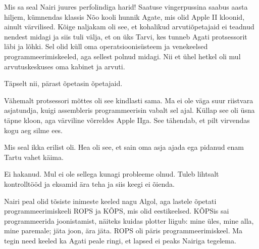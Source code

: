 
Mis sa seal Nairi juures perfolindiga harid! Saatuse vingerpussina saabus 
aasta hiljem, kümnendas klassis Nõo kooli hunnik 
Agate, mis olid Apple II kloonid, 
ainult värvilised. Kõige naljakam oli see, et kohalikud arvutiõpetajaid ei 
teadnud nendest midagi ja siis tuli välja, et on üks Tarvi, kes tunneb Agati
protsessorit läbi ja lõhki. Sel olid küll oma operatsioonisüsteem ja 
venekeelsed programmeerimiskeeled, aga sellest polnud midagi. Nii et ühel hetkel 
oli mul arvutuskeskuses oma kabinet ja arvuti. 


Täpselt nii, pärast õpetasin õpetajaid. 


Vähemalt protsessori mõttes oli see kindlasti sama. Ma ei ole väga suur riistvara 
asjatundja, kuigi assembleris programmeerisin 
vabalt sel ajal. Küllap see oli üsna täpne kloon, aga 
värviline võrreldes Apple IIga. See tähendab, et pilt virvendas kogu aeg 
silme ees. 


Mis seal ikka erilist oli. Hea oli see, et sain oma asja ajada ega pidanud enam Tartu vahet 
käima.


Ei hakanud. Mul ei ole sellega kunagi probleeme olnud. Tuleb 
lihtsalt kontrolltööd ja eksamid ära teha ja siis keegi ei õienda.

Nairi peal olid tõsiste inimeste keeled nagu Algol, aga 
lastele õpetati programmeerimiskeeli ROPS ja 
KÕPS, mis olid eestikeelsed. KÕPSis 
sai programmeerida joonistamist, näiteks kuidas plotter 
liigub: mine üles, mine alla, mine paremale; jäta joon, ära jäta. ROPS oli 
päris programmeerimiskeel. Ma tegin need keeled ka Agati peale ringi, et 
lapsed ei peaks Nairiga tegelema. 


